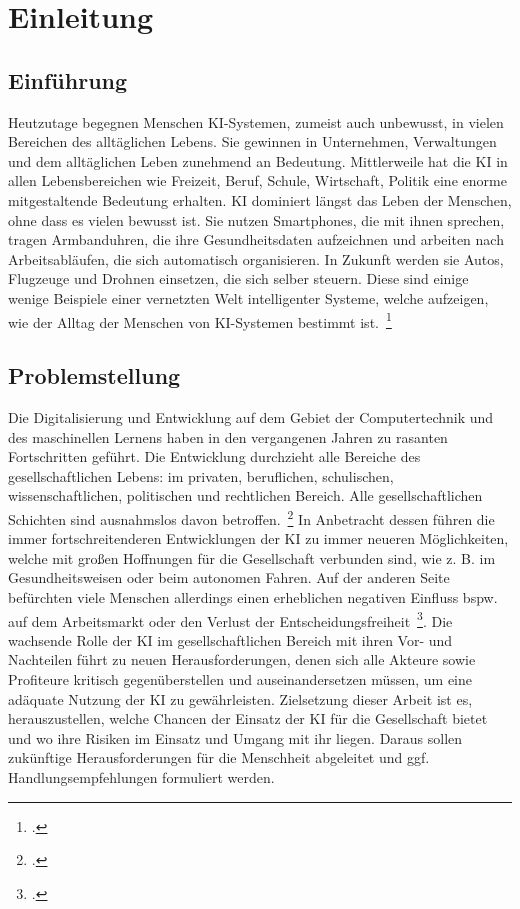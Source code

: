 \section{Einleitung}
\subsection{Einführung}
Heutzutage begegnen Menschen \ac{KI}-Systemen, zumeist auch unbewusst, in vielen Bereichen des alltäglichen Lebens. Sie gewinnen in Unternehmen, Verwaltungen und dem alltäglichen
Leben zunehmend an Bedeutung. 
Mittlerweile hat die \ac{KI} in allen Lebensbereichen wie Freizeit, Beruf, Schule, Wirtschaft, Politik eine enorme mitgestaltende Bedeutung erhalten. \ac{KI} dominiert 
längst das Leben der Menschen, ohne dass es vielen bewusst ist. Sie nutzen Smartphones, die mit ihnen sprechen, tragen Armbanduhren, die ihre Gesundheitsdaten aufzeichnen und arbeiten nach Arbeitsabläufen, die 
sich automatisch organisieren. In Zukunft werden sie Autos, Flugzeuge und Drohnen einsetzen, die sich selber steuern. Diese sind einige wenige Beispiele einer vernetzten Welt intelligenter 
Systeme, welche aufzeigen, wie der Alltag der Menschen von \ac{KI}-Systemen bestimmt ist.~\footcite[\vglf][]{Mainzer.2019}
\subsection{Problemstellung}
Die Digitalisierung und Entwicklung auf dem Gebiet der Computertechnik und des maschinellen Lernens haben in den vergangenen Jahren zu rasanten Fortschritten geführt. Die Entwicklung
durchzieht alle Bereiche des gesellschaftlichen Lebens: im privaten, beruflichen, schulischen, wissenschaftlichen, politischen und rechtlichen Bereich. Alle gesellschaftlichen
Schichten sind ausnahmslos davon betroffen.~\footcite[\vglf][]{Lenzen.2020}
In Anbetracht dessen führen die immer fortschreitenderen Entwicklungen der KI zu immer neueren Möglichkeiten, welche mit großen Hoffnungen für die Gesellschaft verbunden sind, wie z. B. im Gesundheitsweisen 
oder beim autonomen Fahren. 
Auf der anderen Seite befürchten viele Menschen allerdings einen erheblichen negativen Einfluss bspw. auf dem Arbeitsmarkt oder den Verlust der Entscheidungsfreiheit~\footcite[\vglf][]{Wittpahl.2018}.
Die wachsende Rolle der \ac{KI} im gesellschaftlichen Bereich mit ihren Vor- und Nachteilen führt zu neuen Herausforderungen, denen sich alle Akteure sowie Profiteure kritisch 
gegenüberstellen und auseinandersetzen müssen, um eine adäquate Nutzung der \ac{KI} zu gewährleisten. Zielsetzung dieser Arbeit ist es, herauszustellen, welche Chancen
der Einsatz der \ac{KI} für die Gesellschaft bietet und wo ihre Risiken im Einsatz und Umgang mit ihr liegen. Daraus sollen zukünftige Herausforderungen für die Menschheit abgeleitet und ggf. Handlungsempfehlungen formuliert werden.

